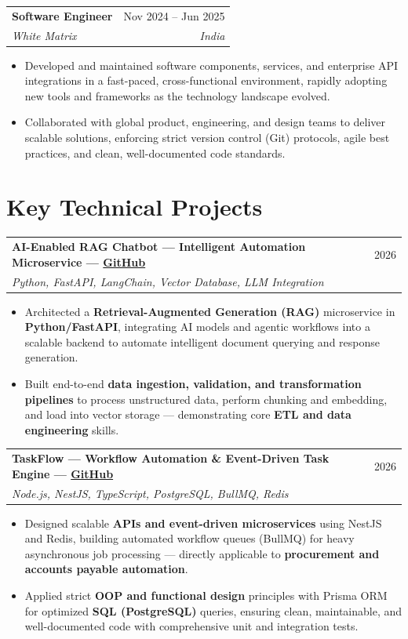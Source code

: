 \documentclass[a4paper,10pt]{article}
\makeatletter
\newcommand{\resumeItem}[1]{\item\small{#1}}
\newcommand{\resumeSubheading}[4]{
  \vspace{2pt}\noindent
  \begin{tabular*}{\textwidth}{@{}l@{\extracolsep{\fill}}r@{}}
    \textbf{#1} & #2 \\
    \textit{\small #3} & \textit{\small #4} \\
  \end{tabular*}\vspace{-4pt}
}
\makeatother
\begin{document}
\vspace{2pt}

\resumeSubheading
{Software Engineer}{Nov 2024 -- Jun 2025}
{White Matrix}{India}

\begin{itemize}[leftmargin=0.15in, topsep=1pt, itemsep=1pt]
\resumeItem{Developed and maintained software components, services, and enterprise API integrations in a fast-paced, cross-functional environment, rapidly adopting new tools and frameworks as the technology landscape evolved.}
\resumeItem{Collaborated with global product, engineering, and design teams to deliver scalable solutions, enforcing strict version control (Git) protocols, agile best practices, and clean, well-documented code standards.}
\end{itemize}

\vspace{1pt}

\section{Key Technical Projects}

\resumeSubheading
{AI-Enabled RAG Chatbot --- Intelligent Automation Microservice \normalfont\small --- \href{https://github.com/gitmen321}{GitHub}}{2026}
{Python, FastAPI, LangChain, Vector Database, LLM Integration}{}

\begin{itemize}[leftmargin=0.15in, topsep=1pt, itemsep=1pt]
\resumeItem{Architected a \textbf{Retrieval-Augmented Generation (RAG)} microservice in \textbf{Python/FastAPI}, integrating AI models and agentic workflows into a scalable backend to automate intelligent document querying and response generation.}
\resumeItem{Built end-to-end \textbf{data ingestion, validation, and transformation pipelines} to process unstructured data, perform chunking and embedding, and load into vector storage --- demonstrating core \textbf{ETL and data engineering} skills.}
\end{itemize}

\vspace{2pt}

\resumeSubheading
{TaskFlow --- Workflow Automation \& Event-Driven Task Engine \normalfont\small --- \href{https://github.com/gitmen321/taskflow-backend}{GitHub}}{2026}
{Node.js, NestJS, TypeScript, PostgreSQL, BullMQ, Redis}{}

\begin{itemize}[leftmargin=0.15in, topsep=1pt, itemsep=1pt]
\resumeItem{Designed scalable \textbf{APIs and event-driven microservices} using NestJS and Redis, building automated workflow queues (BullMQ) for heavy asynchronous job processing --- directly applicable to \textbf{procurement and accounts payable automation}.}
\resumeItem{Applied strict \textbf{OOP and functional design} principles with Prisma ORM for optimized \textbf{SQL (PostgreSQL)} queries, ensuring clean, maintainable, and well-documented code with comprehensive unit and integration tests.}
\end{itemize}
\end{document}
